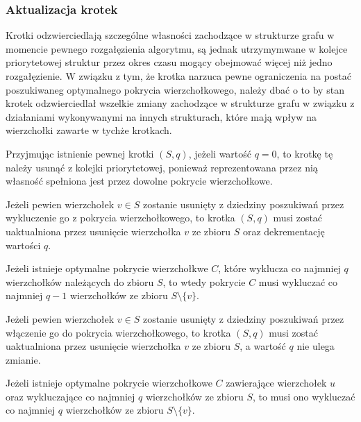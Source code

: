 \subsubsection{\textbf{Aktualizacja krotek}}
\label{sss_ckx_updating_tuples}
\par{
  Krotki odzwierciedlają szczególne własności zachodzące w strukturze grafu w momencie pewnego rozgałęzienia algorytmu, są jednak utrzymymwane w kolejce priorytetowej struktur przez okres czasu mogący obejmować więcej niż jedno rozgałęzienie.
  W związku z tym, że krotka narzuca pewne ograniczenia na postać poszukiwaneg optymalnego pokrycia wierzchołkowego, należy dbać o to by stan krotek odzwierciedlał wszelkie zmiany zachodzące w strukturze grafu w związku z działaniami wykonywanymi na innych strukturach, które mają wpływ na wierzchołki zawarte w tychże krotkach.
}
\par{
  Przyjmując istnienie pewnej krotki $(S, q)$, jeżeli wartość $q = 0$, to krotkę tę należy usunąć z kolejki priorytetowej, ponieważ reprezentowana przez nią własność spełniona jest przez dowolne pokrycie wierzchołkowe.
  \begin{theorem}
    Jeżeli pewien wierzchołek $v \in S$ zostanie usunięty z dziedziny poszukiwań przez wykluczenie go z pokrycia wierzchołkowego, to krotka $(S, q)$ musi zostać uaktualniona przez usunięcie wierzchołka $v$ ze zbioru $S$ oraz dekrementację wartości $q$.
  \end{theorem}
  \begin{bproof}
    Jeżeli istnieje optymalne pokrycie wierzchołkwe $C$, które wyklucza co najmniej $q$ wierzchołków należących do zbioru $S$, to wtedy pokrycie $C$ musi wykluczać co najmniej $q-1$ wierzchołków ze zbioru $S \setminus \{v\}$.
  \end{bproof}
  \begin{theorem}
    Jeżeli pewien wierzchołek $v \in S$ zostanie usunięty z dziedziny poszukiwań przez włączenie go do pokrycia wierzchołkowego, to krotka $(S, q)$ musi zostać uaktualniona przez usunięcie wierzchołka $v$ ze zbioru $S$, a wartość $q$ nie ulega zmianie.
  \end{theorem}
  \begin{bproof}
    Jeżeli istnieje optymalne pokrycie wierzchołkowe $C$ zawierające wierzchołek $u$ oraz wykluczające co najmniej $q$ wierzchołków ze zbioru $S$, to musi ono wykluczać co najmniej $q$ wierzchołków ze zbioru $S \setminus \{v\}$.
  \end{bproof}
}
